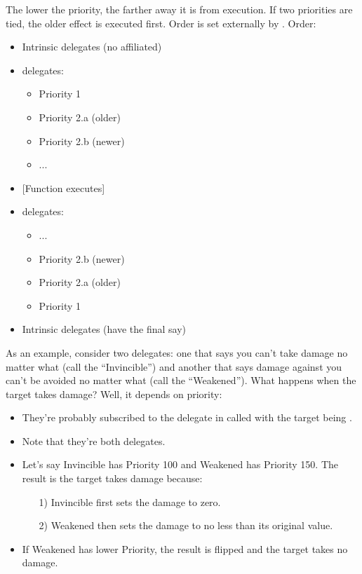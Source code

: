 \begin{enumerate}
{\begin{itemize}
{\begin{tcolorbox}[colback=gray!20!white,colframe=blue!75!black,title=Priorities]
				The lower the priority, the farther away it is from execution. If two priorities are tied, the older effect is executed first. Order is set externally by  . Order:\\
				\begin{itemize}
					\item{Intrinsic  delegates (no  affiliated)}
					\item{ delegates:
						\begin{itemize}
							\item{Priority 1}
							\item{Priority 2.a (older)}
							\item{Priority 2.b (newer)}
							\item{...}
						\end{itemize}
						}
					\item{[Function executes]}
					\item{ delegates:
						\begin{itemize}
							\item{...}
							\item{Priority 2.b (newer)}
							\item{Priority 2.a (older)}
							\item{Priority 1}
						\end{itemize}
						}
					\item{Intrinsic  delegates (have the final say)}
				\end{itemize}
				
			As an example, consider two delegates: one that says you can't take damage no matter what (call the  ``Invincible'') and another that says damage against you can't be avoided no matter what (call the  ``Weakened''). What happens when the target takes damage? Well, it depends on priority:
			\begin{itemize}
				\item{They're probably subscribed to the  delegate in  called  with the target  being .}
				\item{Note that they're both  delegates.}
				\item{Let's say Invincible has Priority 100 and Weakened has Priority 150. The result is the target takes damage because:
					\begin{enumerate}
						\item[1)]{Invincible first sets the damage to zero.}
						\item[2)]{Weakened then sets the damage to no less than its original value.}
					\end{enumerate}
				}
				\item{If Weakened has lower Priority, the result is flipped and the target takes no damage.}
			\end{itemize}
	 

\end{tcolorbox}}
\end{itemize}}
\end{enumerate}

